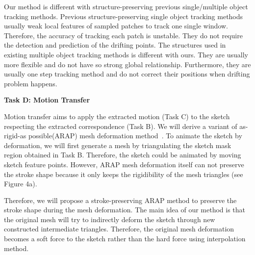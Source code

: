 Our method is different with structure-preserving previous single/multiple object tracking methods. Previous structure-preserving single object tracking methods~\cite{Martinez:2008,Artner:2011,Cehovin:2013,Cai:2014} usually weak local features of sampled patches to track one single window. Therefore, the accuracy of tracking each patch is unstable. They do not require the detection and prediction of the drifting points. The structures used in existing multiple object tracking methods\cite{Zhang:2013} is different with ours. They are usually more flexible and do not have so strong global relationship. Furthermore, they are usually one step tracking method and do not correct their positions when drifting problem happens.



\textbf{Task D: Motion Transfer}

Motion transfer aims to apply the extracted motion (Task C) to the sketch respecting the extracted correspondence (Task B). We will derive a variant of as-rigid-as possible(ARAP) mesh deformation method~\cite{Igarashi:2005}.
To animate the sketch by deformation, we will first generate a mesh by triangulating the sketch mask region obtained in Task B.
Therefore, the sketch could be animated by moving sketch feature points.
However, ARAP mesh deformation itself can not preserve the stroke shape because it only keeps the rigidibility of the mesh triangles (see Figure 4a). 

Therefore, we will propose a stroke-preserving ARAP method to preserve the stroke shape during the mesh deformation. The main idea of our method is that the original mesh will try to indirectly deform the sketch through new constructed intermediate triangles. Therefore, the original mesh deformation becomes a soft force to the sketch rather than the hard force using interpolation method.

